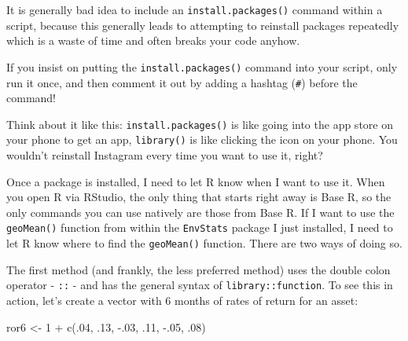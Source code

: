 \documentclass[
  letterpaper,
]{book}
\newenvironment{Shaded}{\begin{snugshade}}{\end{snugshade}}
\newcommand{\DecValTok}[1]{\textcolor[rgb]{0.68,0.00,0.00}{#1}}
\newcommand{\FunctionTok}[1]{\textcolor[rgb]{0.28,0.35,0.67}{#1}}
\newcommand{\NormalTok}[1]{\textcolor[rgb]{0.00,0.23,0.31}{#1}}
\newcommand{\OtherTok}[1]{\textcolor[rgb]{0.00,0.23,0.31}{#1}}
\newcommand{\SpecialCharTok}[1]{\textcolor[rgb]{0.37,0.37,0.37}{#1}}
\begin{document}
\begin{tcolorbox}[enhanced jigsaw, colframe=quarto-callout-tip-color-frame, breakable, arc=.35mm, bottomtitle=1mm, bottomrule=.15mm, colbacktitle=quarto-callout-tip-color!10!white, rightrule=.15mm, colback=white, opacityback=0, opacitybacktitle=0.6, coltitle=black, left=2mm, toptitle=1mm, toprule=.15mm, titlerule=0mm, leftrule=.75mm, title=\textcolor{quarto-callout-tip-color}{\faLightbulb}\hspace{0.5em}{Tip from the Helpdesk: You only need to install a package once}]

It is generally bad idea to include an \texttt{install.packages()}
command within a script, because this generally leads to attempting to
reinstall packages repeatedly which is a waste of time and often breaks
your code anyhow.

If you insist on putting the \texttt{install.packages()} command into
your script, only run it once, and then comment it out by adding a
hashtag (\texttt{\#}) before the command!

Think about it like this: \texttt{install.packages()} is like going into
the app store on your phone to get an app, \texttt{library()} is like
clicking the icon on your phone. You wouldn't reinstall Instagram every
time you want to use it, right?

\end{tcolorbox}

Once a package is installed, I need to let R know when I want to use it.
When you open R via RStudio, the only thing that starts right away is
Base R, so the only commands you can use natively are those from Base R.
If I want to use the \texttt{geoMean()} function from within the
\texttt{EnvStats} package I just installed, I need to let R know where
to find the \texttt{geoMean()} function. There are two ways of doing so.

The first method (and frankly, the less preferred method) uses the
double colon operator - \texttt{::} - and has the general syntax of
\texttt{library::function}. To see this in action, let's create a vector
with 6 months of rates of return for an asset:

\begin{Shaded}
\begin{Highlighting}[]
\NormalTok{ror6 }\OtherTok{\textless{}{-}} \DecValTok{1} \SpecialCharTok{+} \FunctionTok{c}\NormalTok{(.}\DecValTok{04}\NormalTok{, .}\DecValTok{13}\NormalTok{, }\SpecialCharTok{{-}}\NormalTok{.}\DecValTok{03}\NormalTok{, .}\DecValTok{11}\NormalTok{, }\SpecialCharTok{{-}}\NormalTok{.}\DecValTok{05}\NormalTok{, .}\DecValTok{08}\NormalTok{)}
\end{Highlighting}
\end{Shaded}
\end{document}
